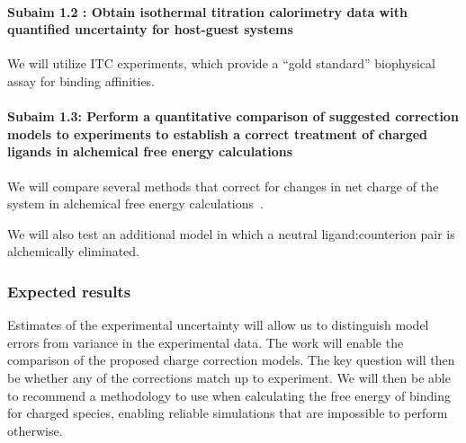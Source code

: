 \documentclass[10pt,final]{article}
\newcommand{\subsubsubsection}[1]{\paragraph*{#1}}
\begin{document}

\subsubsubsection{Subaim 1.2 : Obtain isothermal titration calorimetry data with quantified uncertainty for host-guest systems}

We will utilize ITC experiments, which provide a “gold standard” biophysical assay for binding affinities.






\subsubsubsection{Subaim 1.3: Perform a quantitative comparison of suggested correction models to experiments to establish a correct treatment of charged ligands in alchemical free energy calculations}
We will compare several methods that correct for changes in net charge of the system in alchemical free energy calculations~\cite{Reif2013a,Rocklin2013a}.


We will also test an additional model in which a neutral ligand:counterion pair is alchemically eliminated.

\subsubsection*{Expected results}
Estimates of the experimental uncertainty will allow us to distinguish model errors from variance in the experimental data.
The work will enable the comparison of the proposed charge correction models. 
The key question will then be whether any of the corrections  match up to experiment.
We will then be able to recommend a methodology to use when calculating the free energy of binding for charged species, enabling reliable simulations that are impossible to perform otherwise.
\end{document}
